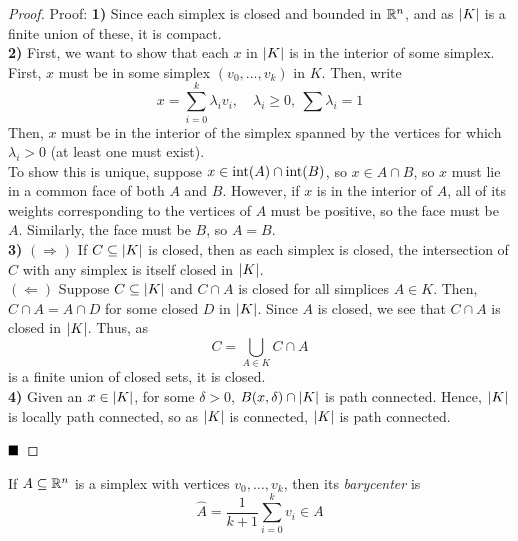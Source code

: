 \begin{proof}{Proof:}
    \textbf{1)} Since each simplex is closed and bounded in $\R^n$, and as $\abs{K}$ is a finite union of these, it is compact.\\

    \textbf{2)} First, we want to show that each $x$ in $\abs{K}$ is in the interior of some simplex.\\

    First, $x$ must be in some simplex $(v_0, \ldots, v_k)$ in $K$. Then, write
    \[ x = \sum_{i = 0}^{k} \lambda_iv_i, \quad \lambda_i \geq 0,\ \sum \lambda_i = 1 \]
    Then, $x$ must be in the interior of the simplex spanned by the vertices for which $\lambda_i > 0$ (at least one must exist).\\

    To show this is unique, suppose $x \in \tt{int}(A) \cap \tt{int}(B)$, so $x \in A \cap B$, so $x$ must lie in a common face of both $A$ and $B$. However, if $x$ is in the interior of $A$, all of its weights corresponding to the vertices of $A$ must be positive, so the face must be $A$. Similarly, the face must be $B$, so $A = B$.\\

    \textbf{3)} $(\Rightarrow)$ If $C \subseteq \abs{K}$ is closed, then as each simplex is closed, the intersection of $C$ with any simplex is itself closed in $\abs{K}$.\\

    $(\Leftarrow)$ Suppose $C \subseteq \abs{K}$ and $C \cap A$ is closed for all simplices $A \in K$. Then, $C \cap A = A \cap D$ for some closed $D$ in $\abs{K}$. Since $A$ is closed, we see that $C \cap A$ is closed in $\abs{K}$. Thus, as
    \[ C = \bigcup_{A \in K} C \cap A \]
    is a finite union of closed sets, it is closed.\\

    \textbf{4)} Given an $x \in \abs{K}$, for some $\delta > 0$, $B(x, \delta) \cap \abs{K}$ is path connected. Hence, $\abs{K}$ is locally path connected, so as $\abs{K}$ is connected, $\abs{K}$ is path connected.

    $\qed$
\end{proof}

\begin{definition}
    If $A \subseteq \R^n$ is a simplex with vertices $v_0, \ldots, v_k$, then its \emph{barycenter} is
    \[ \widehat{A} = \frac{1}{k + 1}\sum_{i = 0}^{k} v_i \in A \]
\end{definition}

